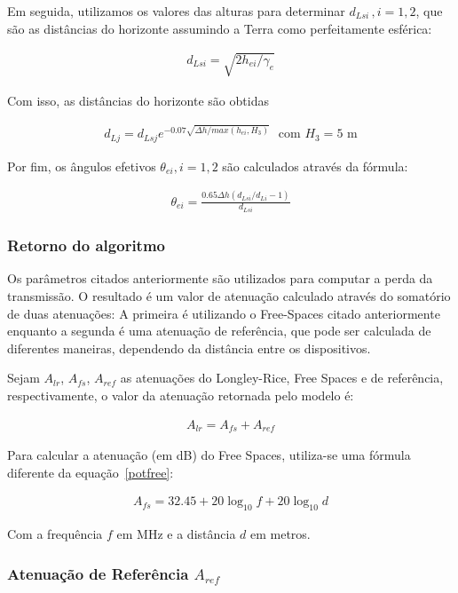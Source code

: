 Em seguida, utilizamos os valores das alturas para determinar $d_{Lsi}\, , i=1,2$, que são as distâncias do horizonte assumindo a Terra como perfeitamente esférica:

\begin{align}
\label{d_lsi} d_{Lsi} = \sqrt{2h_{ei}/\gamma_e}
\end{align}

Com isso, as distâncias do horizonte são obtidas

\begin{align}
\label{d_lj} d_{Lj} = d_{Lsj}e^{-0.07\sqrt{\Delta h / max(h_{ei},H_3)}} \,\,\,\, \text{com $H_3 = 5$ m}
\end{align}

Por fim, os ângulos efetivos $\theta_{ei}, i=1,2$ são calculados através da fórmula:

\begin{align}
\label{oei} 	\theta_{ei} = \frac{0.65\Delta h(d_{Lsi}/d_{Li} -1)}{d_{Lsi}}
\end{align}


\subsubsection{Retorno do algoritmo}

Os parâmetros citados anteriormente são utilizados para computar a perda da transmissão. O resultado é um valor de atenuação calculado através do somatório de duas atenuações: A primeira é utilizando o Free-Spaces citado anteriormente enquanto a segunda é uma atenuação de referência, que pode ser calculada de diferentes maneiras, dependendo da distância entre os dispositivos.

Sejam $A_{lr}$, $A_{fs}$, $A_{ref}$ as atenuações do Longley-Rice, Free Spaces e de referência, respectivamente, o valor da atenuação retornada pelo modelo é:

\begin{align}
\label{a_lr} A_{lr} = A_{fs} + A_{ref}
\end{align}

Para calcular a atenuação (em dB) do Free Spaces, utiliza-se uma fórmula diferente da equação~\ref{potfree}:

\begin{align}
\label{a_fs} A_{fs} = 32.45 + 20 \log_{10}f + 20 \log_{10}d 
\end{align}

Com a frequência $f$ em MHz e a distância $d$ em metros.

\subsubsection{Atenuação de Referência $A_{ref}$}

